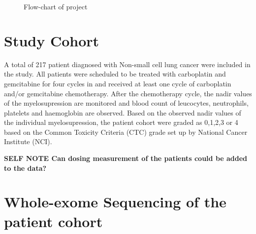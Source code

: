 \begin{figure}[ht]
  \centering
{}
	 \caption{Flow-chart of project}
	\label{Chart of project}
\end{figure}  
  
 \section{Study Cohort}

A total of 217 patient diagnosed with Non-small cell lung cancer were included in the study. All patients were scheduled to be treated with carboplatin and gemcitabine for four cycles in and received at least one cycle of carboplatin and/or gemcitabine chemotherapy. After the chemotherapy cycle, the nadir values of the myelosupression are monitored and blood count of leucocytes, neutrophils, platelets and haemoglobin are observed. Based on the observed nadir values of the individual myelosupression, the patient cohort were graded as 0,1,2,3 or 4 based on the Common Toxicity Criteria (CTC) \cite{trotti2000common} grade set up by National Cancer Institute (NCI). 

\textbf{SELF NOTE Can dosing measurement of the patients could be added to the data?}


\section{Whole-exome Sequencing of the patient cohort}

